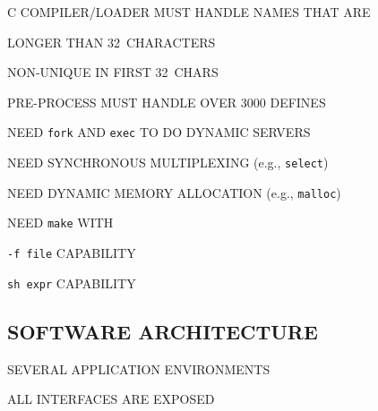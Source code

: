 \begin{bwslide}

\begin{nrtc}
\item	C COMPILER/LOADER MUST HANDLE NAMES THAT ARE
    \begin{nrtc}
    \item	LONGER THAN 32~CHARACTERS

    \item	NON-UNIQUE IN FIRST 32~CHARS

    \item	PRE-PROCESS MUST HANDLE OVER 3000 DEFINES
    \end{nrtc}

\item	NEED \verb"fork" AND \verb"exec" TO DO DYNAMIC SERVERS

\item	NEED SYNCHRONOUS MULTIPLEXING (e.g., \verb"select")

\item	NEED DYNAMIC MEMORY ALLOCATION (e.g., \verb"malloc")

\item	NEED \verb"make" WITH
    \begin{nrtc}
    \item	\verb"-f file" CAPABILITY

    \item	\verb"sh expr" CAPABILITY
    \end{nrtc}
\end{nrtc}
\end{bwslide}


\begin{bwslide}
\part*	{SOFTWARE ARCHITECTURE}\bf

\begin{nrtc}
\item	SEVERAL APPLICATION ENVIRONMENTS

\item	ALL INTERFACES ARE EXPOSED
\end{nrtc}
\end{bwslide}




